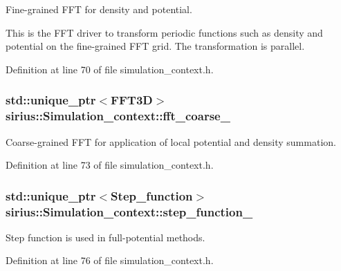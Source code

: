 Fine-\/grained F\+F\+T for density and potential. 

This is the F\+F\+T driver to transform periodic functions such as density and potential on the fine-\/grained F\+F\+T grid. The transformation is parallel. 

Definition at line 70 of file simulation\+\_\+context.\+h.

\hypertarget{classsirius_1_1_simulation__context_a4ff2eb943ab88c0e9f3971176c03d626}{}
\subsubsection[{fft\+\_\+coarse\+\_\+}]{\setlength{\rightskip}{0pt plus 5cm}std\+::unique\+\_\+ptr$<${\bf F\+F\+T3\+D}$>$ sirius\+::\+Simulation\+\_\+context\+::fft\+\_\+coarse\+\_\+\hspace{0.3cm}{\ttfamily [private]}}\label{classsirius_1_1_simulation__context_a4ff2eb943ab88c0e9f3971176c03d626}


Coarse-\/grained F\+F\+T for application of local potential and density summation. 



Definition at line 73 of file simulation\+\_\+context.\+h.

\hypertarget{classsirius_1_1_simulation__context_a0a1057d06e126cf048247071de680c4f}{}
\subsubsection[{step\+\_\+function\+\_\+}]{\setlength{\rightskip}{0pt plus 5cm}std\+::unique\+\_\+ptr$<${\bf Step\+\_\+function}$>$ sirius\+::\+Simulation\+\_\+context\+::step\+\_\+function\+\_\+\hspace{0.3cm}{\ttfamily [private]}}\label{classsirius_1_1_simulation__context_a0a1057d06e126cf048247071de680c4f}


Step function is used in full-\/potential methods. 



Definition at line 76 of file simulation\+\_\+context.\+h.

